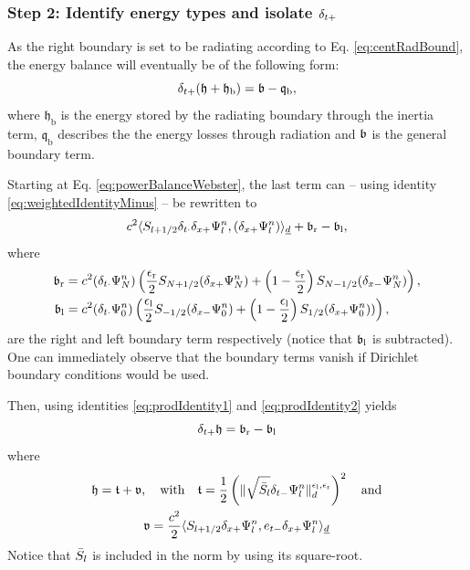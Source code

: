 {\subsubsection{Step 2: Identify energy types and isolate $\delta_{t+}$} 
As the right boundary is set to be radiating according to Eq. \eqref{eq:centRadBound}, the energy balance will eventually be of the following form:
\begin{equation}\label{eq:radiatingEnergyForm}
    \delta_{t+}(\mathfrak{h}+\mathfrak{h}_\text{b}) = \mathfrak{b}-\mathfrak{q}_\text{b},
\end{equation}
where $\mathfrak{h}_\text{b}$ is the energy stored by the radiating boundary through the inertia term, $\mathfrak{q}_\text{b}$ describes the the energy losses through radiation and $\mathfrak{b}$ is the general boundary term.

Starting at Eq. \eqref{eq:powerBalanceWebster}, the last term can -- using identity \eqref{eq:weightedIdentityMinus} -- be rewritten to
\begin{equation*}
    c^2\langle S_{l+1/2} \delta_{t\cdot} \delta_{x+} \Psi_l^n, (\delta_{x+} \Psi_l^n)\rangle_{\underline{d}} + \mathfrak{b}_\text{r} - \mathfrak{b}_\text{l},
\end{equation*}
where
\begin{subequations}
    \begin{align}
     \mathfrak{b}_\text{r} &= c^2(\delta_{t\cdot}\Psi_N^n)\left(\frac{\epsilon_\text{r}}{2}S_{N+1/2}(\delta_{x+} \Psi_N^n) + \left(1-\frac{\epsilon_\text{r}}{2}\right)S_{N-1/2}(\delta_{x-}\Psi_N^n)\right), \\
     \mathfrak{b}_\text{l} &= c^2(\delta_{t\cdot}\Psi_0^n)\left(\frac{\epsilon_\text{l}}{2}S_{-1/2}(\delta_{x-}\Psi_0^n)+\left(1-\frac{\epsilon_\text{l}}{2}\right)S_{1/2}(\delta_{x+} \Psi_0^n))\right),
    \end{align}
\end{subequations}
are the right and left boundary term respectively (notice that $\mathfrak{b}_\text{l}$ is subtracted). One can immediately observe that the boundary terms vanish if Dirichlet boundary conditions would be used. 
    
Then, using identities \eqref{eq:prodIdentity1} and \eqref{eq:prodIdentity2} yields 
\begin{equation*}
    \delta_{t+} \mathfrak{h} = \mathfrak{b}_\text{r} - \mathfrak{b}_\text{l}
\end{equation*}
where
\begin{equation}\label{eq:energyBalanceWebster}
    \begin{gathered}
        \mathfrak{h} = \mathfrak{t} + \mathfrak{v}, \quad \text{with} \quad \mathfrak{t} = \frac{1}{2} \left(\lVert\sqrt{\bar{S}_l} \delta_{t-} \Psi_l^n \rVert_d^{\epsilon_\text{l}, \epsilon_\text{r}}\right)^2 \quad \text{and} \\
        \mathfrak{v} = \frac{c^2}{2}\langle S_{l+1/2}\delta_{x+} \Psi_l^n, e_{t-}\delta_{x+}\Psi_l^n\rangle_{\underline{d}}
    \end{gathered}
\end{equation}
Notice that $\bar{S}_l$ is included in the norm by using its square-root.

}

